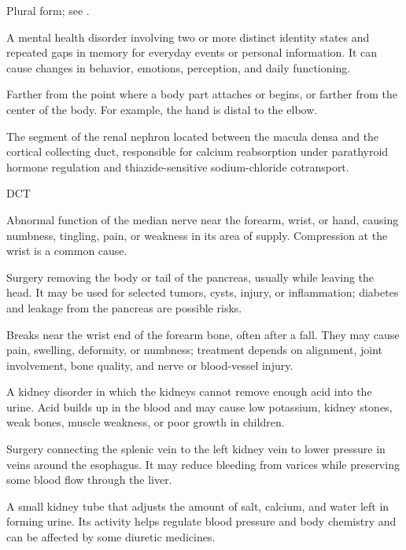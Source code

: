  Plural form; see .

 A mental health disorder involving two or more distinct identity states and repeated gaps in memory for everyday events or personal information. It can cause changes in behavior, emotions, perception, and daily functioning.

 Farther from the point where a body part attaches or begins, or farther from the center of the body. For example, the hand is distal to the elbow.

 The segment of the renal nephron located between the macula densa and the cortical collecting duct, responsible for calcium reabsorption under parathyroid hormone regulation and thiazide-sensitive sodium-chloride cotransport.

\synonyms
DCT

 Abnormal function of the median nerve near the forearm, wrist, or hand, causing numbness, tingling, pain, or weakness in its area of supply. Compression at the wrist is a common cause.

 Surgery removing the body or tail of the pancreas, usually while leaving the head. It may be used for selected tumors, cysts, injury, or inflammation; diabetes and leakage from the pancreas are possible risks.

 Breaks near the wrist end of the forearm bone, often after a fall. They may cause pain, swelling, deformity, or numbness; treatment depends on alignment, joint involvement, bone quality, and nerve or blood-vessel injury.

 A kidney disorder in which the kidneys cannot remove enough acid into the urine. Acid builds up in the blood and may cause low potassium, kidney stones, weak bones, muscle weakness, or poor growth in children.

 Surgery connecting the splenic vein to the left kidney vein to lower pressure in veins around the esophagus. It may reduce bleeding from varices while preserving some blood flow through the liver.

 A small kidney tube that adjusts the amount of salt, calcium, and water left in forming urine. Its activity helps regulate blood pressure and body chemistry and can be affected by some diuretic medicines.

